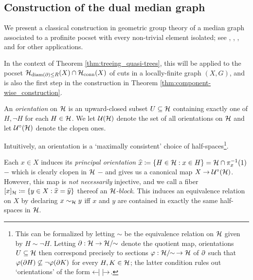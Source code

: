 \documentclass[reqno]{amsart}
\begin{document}
    \subsection{Construction of the dual median graph}\label{sec:the_dual_median_graph_of_a_pocset}

    We present a classical construction in geometric group theory of a median graph associated to a profinite pocset with every non-trivial element isolated; see \cite{Dun79}, \cite{Rol98}, \cite{Sag95}, and \cite{NR03} for other applications.

    In the context of Theorem \ref{thm:treeing_quasi-trees}, this will be applied to the pocset $\mathcal{H}_{\operatorname{diam}(\partial)\leq R}(X)\cap\mathcal{H}_\mathrm{conn}(X)$ of cuts in a locally-finite graph $(X,G)$, and is also the first step in the construction in Theorem \ref{thm:component-wise_construction}.
    
    \begin{definition}\label{def:orientation}
        An \textit{orientation} on $\mathcal{H}$ is an upward-closed subset $U\subseteq\mathcal{H}$ containing exactly one of $H,\lnot H$ for each $H\in\mathcal{H}$. We let $\mathcal{U}(\mathcal{H})$ denote the set of all orientations on $\mathcal{H}$ and let $\mathcal{U}^\circ(\mathcal{H})$ denote the clopen ones.

        Intuitively, an orientation is a `maximally consistent' choice of half-spaces\footnote{This can be formalized by letting $\sim$ be the equivalence relation on $\mathcal{H}$ given by $H\sim\lnot H$. Letting $\partial:\mathcal{H}\to\mathcal{H}/\!\!\sim$ denote the quotient map, orientations $U\subseteq\mathcal{H}$ then correspond precisely to sections $\varphi:\mathcal{H}/\!\!\sim\,\to\mathcal{H}$ of $\partial$ such that $\varphi(\partial H)\not\subseteq\lnot\varphi(\partial K)$ for every $H,K\in\mathcal{H}$; the latter condition rules out `orientations' of the form $\leftarrow\hspace{-4.15pt}|\,\,|\hspace{-4.15pt}\rightarrow$.}.
    \end{definition}

    \begin{example}
        Each $x\in X$ induces its \textit{principal orientation} $\widehat{x}\coloneqq\left\{H\in\mathcal{H}: x\in H\right\}=\mathcal{H}\cap\pi^{-1}_x(1)$ $-$ which is clearly clopen in $\mathcal{H}$ $-$ and gives us a canonical map $X\to\mathcal{U}^\circ(\mathcal{H})$. However, this map is \textit{not necessarily} injective, and we call a fiber $[x]_{\mathcal{H}}\coloneqq\left\{y\in X:\widehat{x}=\widehat{y}\right\}$ thereof an \textit{$\mathcal{H}$-block}. This induces an equivalence relation on $X$ by declaring $x\sim_{\mathcal{H}}y$ iff $x$ and $y$ are contained in exactly the same half-spaces in $\mathcal{H}$.
    \end{example}
\end{document}
